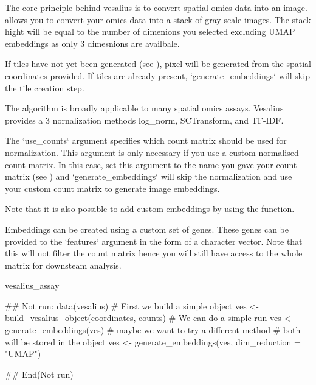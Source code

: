 \documentclass[a4paper]{book}
\begin{document}
%
\begin{Details}
The core principle behind vesalius is to convert spatial omics
data into an image.  allows you to convert
your omics data into a stack of gray scale images.
The stack hight will be equal to the number of dimenions you
selected excluding UMAP embeddings as only 3 dimesnions are availbale.

If tiles have not yet been generated (see ),
pixel will be generated from the spatial coordinates provided. 
If tiles are already present, `generate\_embeddings` will skip the
tile creation step. 

The algorithm is broadly applicable to many spatial omics assays.
Vesalius provides a 3 nornalization methods log\_norm, SCTransform,
and TF-IDF.

The `use\_counts` argument specifies which count matrix should be used
for normalization. This argument is only necessary if you use a custom
normalised count matrix. In this case, set this argument to the name
you gave your count matrix (see ) and
`generate\_embeddings` will skip the normalization and use your custom
count matrix to generate image embeddings. 

Note that it is also possible to add custom embeddings by using the 
 function. 

Embeddings can be created using a custom set of genes. These genes 
can be provided to the `features` argument in the form of a character
vector. Note that this will not filter the count matrix hence you 
will still have access to the whole matrix for downsteam analysis.
\end{Details}
%
\begin{Value}
vesalius\_assay
\end{Value}
%
\begin{Examples}
\begin{ExampleCode}
## Not run: 
data(vesalius)
# First we build a simple object
ves <- build_vesalius_object(coordinates, counts)
# We can do a simple run 
ves <- generate_embeddings(ves)
# maybe we want to try a different method
# both will be stored in the object
ves <- generate_embeddings(ves, dim_reduction = "UMAP")


## End(Not run)
\end{ExampleCode}
\end{Examples}
\end{document}
